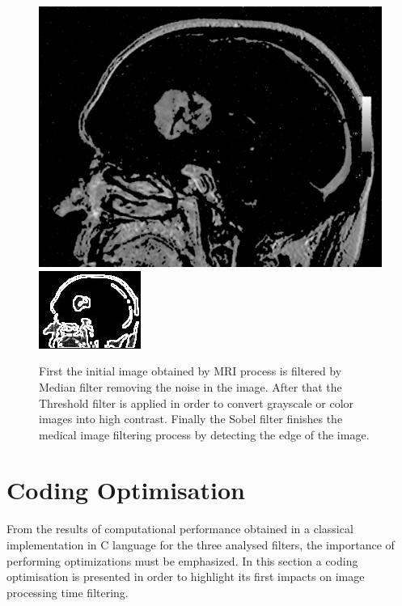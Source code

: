 \documentclass[journal]{IEEEtran}
\begin{document}
\begin{figure}[!ht]
  \par\bigskip %
  \includegraphics[scale=0.115]{cancer_noise_filtre_median_seuillage.png}
  \includegraphics[scale=0.98]{results_3.jpg}
  
  \protect\caption{First the initial image obtained by MRI process is
  filtered by Median filter removing the noise in the image. After that the Threshold filter is applied in order to convert grayscale or color images into high contrast.
  Finally the Sobel filter finishes the medical image filtering process by detecting the edge of the image.}
\end{figure}

\section{Coding Optimisation}


From the results of computational performance obtained in a classical implementation in C language for the three analysed filters, the importance of performing optimizations must be emphasized. In this section a coding optimisation is presented in order to highlight its first impacts on image processing time filtering.
\end{document}
